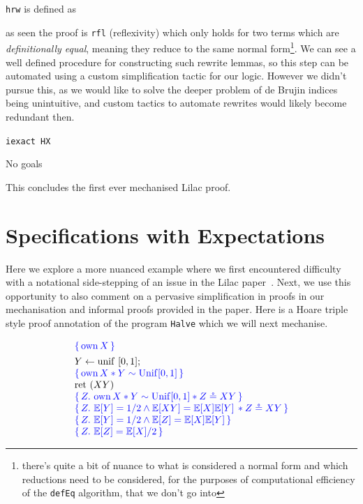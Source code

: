 \texttt{hrw} is defined as

as seen the proof is \texttt{rfl} (reflexivity) which only holds for two terms which are \emph{definitionally equal},
meaning they reduce to the same normal form\footnote{there's quite a bit of nuance to what is considered a normal form
and which reductions need to be considered, for the purposes of computational efficiency of the \texttt{defEq} algorithm,
that we don't go into}. We can see a well defined procedure for constructing such rewrite lemmas, so this step can be automated
using a custom simplification tactic for our logic. However we didn't pursue this, as we would like to solve the deeper
problem of de Brujin indices being unintuitive, and custom tactics to automate rewrites would likely become redundant then.

\texttt{iexact HX}
\begin{leancode}
No goals
\end{leancode}

This concludes the first ever mechanised Lilac proof.

\section{Specifications with Expectations}
\label{sec:expectation}

Here we explore a more nuanced example where we first encountered difficulty with a notational side-stepping
of an issue in the Lilac paper~\citep{lilac}. Next, we use this opportunity to also comment on a pervasive
simplification in proofs in our mechanisation and informal proofs provided in the paper. Here is a Hoare triple
style proof annotation of the program \texttt{Halve} which we will next mechanise.

\[
\begin{array}{l}
\textcolor{blue}{\{\,\mathrm{own}\,X\,\}} \\[4pt]
Y \leftarrow \mathrm{unif}\ [0,1];\\
\textcolor{blue}{\{\,\mathrm{own}\,X * Y \sim \mathrm{Unif}[0,1]\,\}}\\
\mathrm{ret}\ (XY)\\
\textcolor{blue}{\{\,Z.\ \mathrm{own}\,X * Y \sim \mathrm{Unif}[0,1] * Z \circeq XY\,\}}\\
\textcolor{blue}{\{\,Z.\ \mathbb{E}[Y] = 1/2 \wedge \mathbb{E}[XY] = \mathbb{E}[X]\mathbb{E}[Y]\, * Z \circeq XY\,\}}\\
\textcolor{blue}{\{\,Z.\ \mathbb{E}[Y] = 1/2 \wedge \mathbb{E}[Z] = \mathbb{E}[X]\mathbb{E}[Y]\,\}}\\
\textcolor{blue}{\{\,Z.\ \mathbb{E}[Z] = \mathbb{E}[X]/2\,\}}
\end{array}
\]

